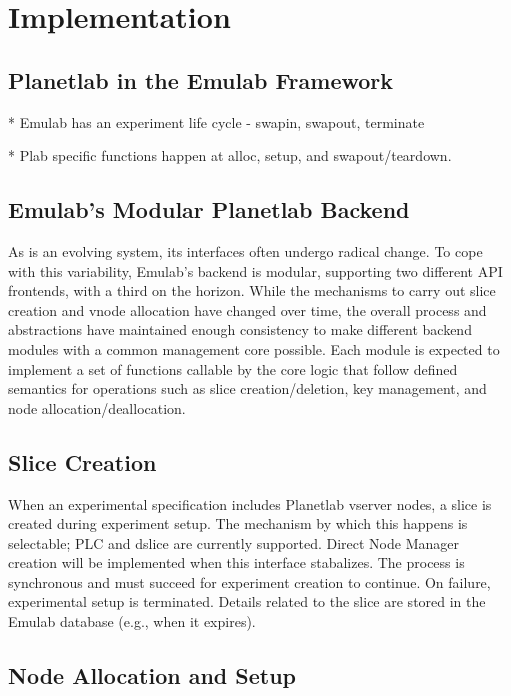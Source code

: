 \section{Implementation}

\subsection{Planetlab in the Emulab Framework}

* Emulab has an experiment life cycle
  - swapin, swapout, terminate

* Plab specific functions happen at alloc, setup, and swapout/teardown.

\subsection{Emulab's Modular Planetlab Backend}

As \plab is an evolving system, its interfaces often undergo radical
change.  To cope with this variability, Emulab's \plab backend is
modular, supporting two different \plab API frontends, with a third on
the horizon.  While the mechanisms to carry out slice creation and
vnode allocation have changed over time, the overall process and
abstractions have maintained enough consistency to make different
backend modules with a common management core possible.  Each module
is expected to implement a set of functions callable by the core logic
that follow defined semantics for operations such as slice
creation/deletion, key management, and node allocation/deallocation.

\subsection{Slice Creation}

When an experimental specification includes Planetlab vserver nodes, a
slice is created during experiment setup.  The mechanism by which this
happens is selectable; PLC and dslice are currently supported.  Direct
Node Manager creation will be implemented when this interface stabalizes.  
The process is synchronous and must succeed for experiment creation to
continue.  On failure, experimental setup is terminated.  Details related 
to the slice are stored in the Emulab database (e.g., when it
expires).

\subsection{Node Allocation and Setup}


